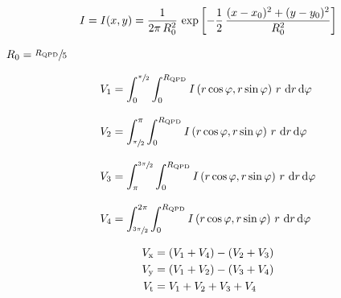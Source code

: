\begin{equation}
  I = I(x, y) = \frac{1}{2\pi\,R_{0}^{2}}\,\exp\left[ 
  -\frac{1}{2}\,\frac{(x-x_{0})^{2} + (y - y_{0})^{2}}{R_{0}^{2}} \right]
    \label{eq:Th-intensity}
\end{equation}

$R_{0}=\sfrac{R_{\mathrm{QPD}}}{5}$


\begin{subequations}
\begin{align}
  V_{\mathrm{1}} & = \int_{0}^{\sfrac{\pi}{2}}\int_{0}^{R_{\mathrm{QPD}}}
  I\left( r\cos\varphi, r\sin\varphi \right)\,r\,\dd{r}\dd{\varphi} 
  \\[3mm]
  V_{\mathrm{2}} & = \int_{\sfrac{\pi}{2}}^{\pi}\int_{0}^{R_{\mathrm{QPD}}}
  I\left(r\cos\varphi, r\sin\varphi\right)\,r\,\dd{r}\dd{\varphi} 
  \\[3mm]
  V_{\mathrm{3}} & = \int_{\pi}^{\sfrac{3\pi}{2}}\int_{0}^{R_{\mathrm{QPD}}}
  I\left(r\cos\varphi, r\sin\varphi\right)\,r\,\dd{r}\dd{\varphi} 
  \\[3mm]
  V_{\mathrm{4}} & = \int_{\sfrac{3\pi}{2}}^{2\pi}\int_{0}^{R_{\mathrm{QPD}}}
  I\left(r\cos\varphi, r\sin\varphi\right)\,r\,\dd{r}\dd{\varphi}
\end{align}
\end{subequations}


\begin{subequations}
\begin{align}
  V_{\mathrm{x}} & = \left( V_{\mathrm{1}}+V_{\mathrm{4}} \right) - \left( V_{\mathrm{2}} + 
  V_{\mathrm{3}}  \right) \\
  V_{\mathrm{y}} & = \left( V_{\mathrm{1}}+V_{\mathrm{2}} \right) - \left( V_{\mathrm{3}} + 
  V_{\mathrm{4}}  \right) \\
  V_{\mathrm{t}} & = V_{\mathrm{1}}+V_{\mathrm{2}} + V_{\mathrm{3}} + V_{\mathrm{4}}
\end{align}
\end{subequations}


